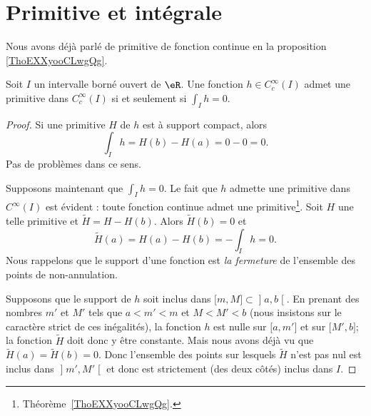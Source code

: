 \section{Primitive et intégrale}

Nous avons déjà parlé de primitive de fonction continue en la proposition \ref{ThoEXXyooCLwgQg}.

\begin{proposition} \label{PropHFWNpRb}
	Soit \( I \) un intervalle borné ouvert de \( \eR\). Une fonction \( h\in C^{\infty}_c(I)\) admet une primitive dans \(  C^{\infty}_c(I)\) si et seulement si \( \int_Ih=0\).
\end{proposition}

\begin{proof}
	Si une primitive \( H\) de \( h\) est à support compact, alors
	\begin{equation}
		\int_Ih=H(b)-H(a)=0-0=0.
	\end{equation}
	Pas de problèmes dans ce sens.

	Supposons maintenant que \( \int_Ih=0\). Le fait que \( h\) admette une primitive dans \(  C^{\infty}(I)\) est évident : toute fonction continue admet une primitive\footnote{Théorème~\ref{ThoEXXyooCLwgQg}.}. Soit \( H\) une telle primitive et \( \tilde H=H-H(b)\). Alors \( \tilde H(b)=0\) et
	\begin{equation}
		\tilde H(a)=H(a)-H(b)=-\int_Ih=0.
	\end{equation}
	Nous rappelons que le support d'une fonction est \emph{la fermeture} de l'ensemble des points de non-annulation.

	Supposons que le support de \( h\) soit inclus dans \( \mathopen[ m , M \mathclose]\subset\mathopen] a , b \mathclose[\). En prenant des nombres \( m'\) et \( M'\) tels que \( a<m'<m\) et \( M<M'<b\) (nous insistons sur le caractère strict de ces inégalités), la fonction \( h\) est nulle sur \( \mathopen[ a , m' \mathclose]\) et sur \( \mathopen[ M' , b \mathclose]\); la fonction \( \tilde H\) doit donc y être constante. Mais nous avons déjà vu que \( \tilde H(a)=\tilde H(b)=0\). Donc l'ensemble des points sur lesquels \( \tilde H\) n'est pas nul est inclus dans \( \mathopen] m' , M' \mathclose[\) et donc est strictement (des deux côtés) inclus dans \( I\).
\end{proof}

